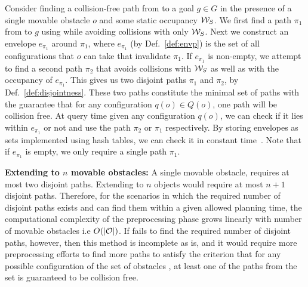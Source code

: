 \documentclass[a4paper]{report}
\begin{document}
Consider finding a collision-free path from \Sstart to a goal $g \in G$ in the presence of a single movable obstacle $o$ and some static occupancy $\mathcal{W}_S$.
We first find a path $\pi_1$ from \Sstart to $g$ using \calP while avoiding collisions with only $\mathcal{W}_S$.
Next we construct an envelope $e_{\pi_1}$ around $\pi_1$, where $e_{\pi_1}$ (by Def.~\ref{def:envp}) is the set of all configurations that $o$ can take that invalidate $\pi_1$.
If $e_{\pi_1}$ is non-empty, we attempt to find a second path $\pi_2$ that avoids collisions with $\mathcal{W}_S$ as well as with the occupancy of $e_{\pi_1}$.
This gives us two disjoint paths $\pi_1$ and $\pi_2$, by Def.~\ref{def:disjointness}.
These two paths constitute the minimal set of paths with the guarantee that for any configuration $q(o) \in Q(o)$, one path will be collision free.
At query time given any configuration $q(o)$, we can check if it lies within $e_{\pi_1}$ or not and use the path $\pi_2$ or $\pi_1$ respectively. By storing envelopes as sets implemented using hash tables, we can check it in constant time~\cite{czech1997perfect}. Note that if $e_{\pi_1}$ is empty, we only require a single path $\pi_1$.

\textbf{Extending to $n$ movable obstacles:} A single movable obstacle, requires at most two disjoint paths. Extending to $n$ objects would require at most $n+1$ disjoint paths. Therefore, for the scenarios in which the required number of disjoint paths exists and \calP can find them within a given allowed planning time, the computational complexity of the preprocessing phase grows linearly with number of movable obstacles i.e $O(|\mathcal{O}|)$.
If \calP fails to find the required number of disjoint paths, however,
then this method is incomplete as is, and it would require more preprocessing efforts to find more paths to satisfy the criterion that for any possible configuration of the set of obstacles \calO, at least one of the paths from the set is guaranteed to be collision free. %
\end{document}
